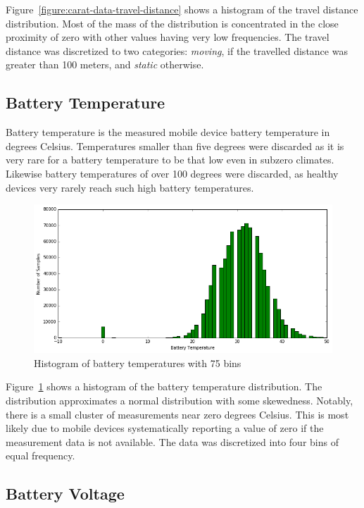 Figure~\ref{figure:carat-data-travel-distance} shows a histogram of the travel distance distribution. Most of the mass of the distribution is concentrated in the close proximity of zero with other values having very low frequencies. The travel distance was discretized to two categories: \textit{moving}, if the travelled distance was greater than 100 meters, and \textit{static} otherwise.

\subsection{Battery Temperature}  

Battery temperature is the measured mobile device battery temperature in degrees Celsius. Temperatures smaller than five degrees were discarded as it is very rare for a battery temperature to be that low even in subzero climates. Likewise battery temperatures of over 100 degrees were discarded, as healthy devices very rarely reach such high battery temperatures.

\begin{figure}[!htbp]
	\centering
	\includegraphics[width=\textwidth]{images/carat-data/battery_temperature.png}
	\caption{Histogram of battery temperatures with 75 bins}
	\label{figure:carat-data-battery-temperature}
\end{figure}  

Figure~\ref{figure:carat-data-battery-temperature} shows a histogram of the battery temperature distribution. The distribution approximates a normal distribution with some skewedness. Notably, there is a small cluster of measurements near zero degrees Celsius. This is most likely due to mobile devices systematically reporting a value of zero if the measurement data is not available. The data was discretized into four bins of equal frequency.

\subsection{Battery Voltage}  

